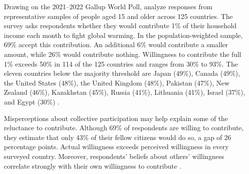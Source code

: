 Drawing on the 2021--2022 Gallup World Poll, \citet{andre_globally_2024} analyze responses from representative samples of people aged 15 and older across 125 countries. The survey asks respondents whether they would contribute 1\% of their household income each month to fight global warming. In the population-weighted sample, 69\% accept this contribution. An additional 6\% would contribute a smaller amount, while 26\% would contribute nothing. Willingness to contribute the full 1\% exceeds 50\% in 114 of the 125 countries and ranges from 30\% to 93\%. The eleven countries below the majority threshold are Japan (49\%), Canada (49\%), the United States (48\%), the United Kingdom (48\%), Pakistan (47\%), New Zealand (46\%), Kazakhstan (45\%), Russia (41\%), Lithuania (41\%), Israel (37\%), and Egypt (30\%) \citep[Figure 1 \& Supplementary Table S4]{andre_globally_2024}. 

Misperceptions about collective participation may help explain some of the reluctance to contribute. Although 69\% of respondents are willing to contribute, they estimate that only 43\% of their fellow citizens would do so, a gap of 26 percentage points. Actual willingness exceeds perceived willingness in every surveyed country. Moreover, respondents' beliefs about others' willingness correlate strongly with their own willingness to contribute \citep[Figure 3 \& Supplementary Table S11]{andre_globally_2024}.

